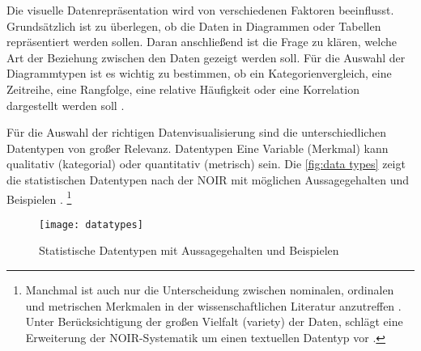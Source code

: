 
Die visuelle Datenrepräsentation wird von verschiedenen Faktoren beeinflusst.
Grundsätzlich ist zu überlegen, ob die Daten in Diagrammen oder Tabellen repräsentiert werden sollen.
Daran anschließend ist die Frage zu klären, welche Art der Beziehung zwischen den Daten gezeigt werden soll.
Für die Auswahl der Diagrammtypen ist es wichtig zu bestimmen, ob ein Kategorienvergleich, eine Zeitreihe, eine Rangfolge, 
eine relative Häufigkeit oder eine Korrelation dargestellt werden soll \cite[vgl.][137]{few_show_2012}.

Für die Auswahl der richtigen Datenvisualisierung sind die unterschiedlichen Datentypen von großer Relevanz.
Datentypen  \cite[99]{kirk_data_2019}  Eine Variable (Merkmal) kann qualitativ (kategorial) oder quantitativ (metrisch) sein.
Die \autoref{fig:data types} zeigt die statistischen Datentypen nach der \acrfull{NOIR} 
mit möglichen Aussagegehalten und Beispielen \cite[vgl.][12 ff.]{bortz_statistik_2010}.
\footnote{Manchmal ist auch nur die Unterscheidung zwischen nominalen, ordinalen und metrischen
Merkmalen in der wissenschaftlichen Literatur anzutreffen \cite[vgl.][20]{cleff_deskriptive_2011}. 
Unter Berücksichtigung der großen Vielfalt (variety) der Daten, schlägt  
eine Erweiterung der \acrshort{NOIR}-Systematik um einen textuellen Datentyp vor \cite[vgl.][100]{kirk_data_2019}.}

 
 \begin{figure}[h]
    \centering
        \texttt{[image: datatypes]}
        \caption{Statistische Datentypen mit Aussagegehalten und Beispielen}
        \label{fig:data types}
\end{figure}



